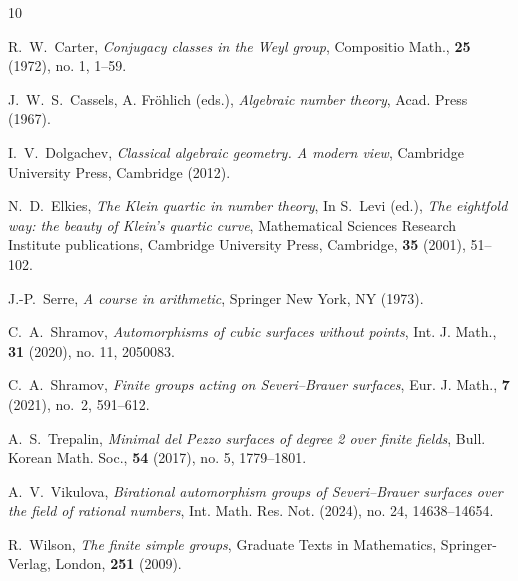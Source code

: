 \documentclass{amsart}
\numberwithin{equation}{section}
\theoremstyle{definition}
\begin{document}
\providecommand{\bysame}{\leavevmode\hbox to3em{\hrulefill}\thinspace}
\providecommand{\MR}{\relax\ifhmode\unskip\space\fi MR }
\providecommand{\MRhref}[2]{%
  \href{http://www.ams.org/mathscinet-getitem?mr=#1}{#2}
}
\providecommand{\href}[2]{#2}
\begin{thebibliography}{10}




R.~W.~Carter, \emph{Conjugacy classes in the Weyl group}, Compositio Math., \textbf{25} (1972), no. 1, 1--59.





J.~W.~S.~Cassels, A. Fr\"ohlich (eds.), \emph{Algebraic number theory}, Acad. Press (1967).


I.~V.~Dolgachev, \emph{Classical algebraic geometry. A modern view}, Cambridge University Press, Cambridge (2012).


N.~D.~Elkies, \emph{The Klein quartic in number theory}, In S.~Levi (ed.), \emph{The eightfold way: the beauty of Klein's
quartic curve},   Mathematical Sciences Research Institute publications, Cambridge University Press, Cambridge,
\textbf{35} (2001), 51--102.  




J.-P.~Serre, \emph{A course in arithmetic}, Springer New York, NY (1973).

C.~A.~Shramov, \emph{Automorphisms of cubic surfaces without points}, Int. J. Math., \textbf{31} (2020), no. 11, 2050083.


C.~A.~Shramov, \emph{Finite groups acting on Severi--Brauer surfaces}, Eur. J. Math.,
\textbf{7} (2021), no.~2, 591--612.



A.~S.~Trepalin,  \emph{Minimal del Pezzo surfaces of degree 2 over finite fields}, Bull. Korean Math. Soc., \textbf{54} (2017), no. 5, 1779--1801.


A.~V.~Vikulova, \emph{Birational automorphism groups of Severi--Brauer surfaces over the field of rational numbers}, Int. Math. Res. Not. (2024), no. 24, 14638--14654. 

R.~Wilson, \emph{The finite simple groups}, Graduate Texts in Mathematics,  Springer-Verlag,
London, \textbf{251} (2009).




\end{thebibliography}
\end{document}
